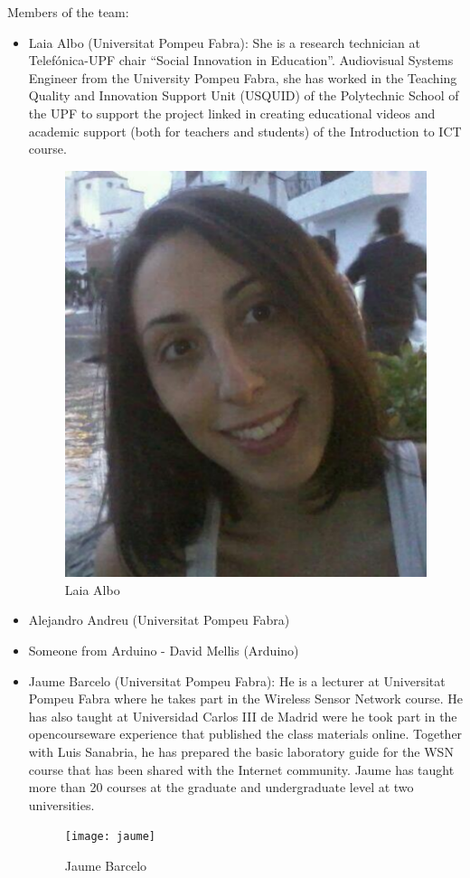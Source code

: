 \documentclass[oneside]{book}   %
\begin{document}
Members of the team:
\begin{itemize}
\item Laia Albo (Universitat Pompeu Fabra): She is a research technician at Telefónica-UPF chair ``Social Innovation in Education''. Audiovisual Systems Engineer from the University Pompeu Fabra, she has worked in the Teaching Quality and Innovation Support Unit (USQUID) of the Polytechnic School of the UPF to support the project linked in creating educational videos and academic support (both for teachers and students) of the Introduction to ICT course.
\begin{figure}
\begin{center}
\includegraphics[width=0.125\linewidth]{laia}
\caption{Laia Albo}
\label{fig:jaume}
\end{center}
\end{figure}
\item Alejandro Andreu (Universitat Pompeu Fabra)
\item Someone from Arduino - David Mellis (Arduino)
\item Jaume Barcelo (Universitat Pompeu Fabra): He is a lecturer at Universitat Pompeu Fabra where he takes part in the Wireless Sensor Network course. He has also taught at Universidad Carlos III de Madrid were he took part in the opencourseware experience that published the class materials online. Together with Luis Sanabria, he has prepared the basic laboratory guide for the WSN course that has been shared with the Internet community. Jaume has taught more than 20 courses at the graduate and undergraduate level at two universities.
\begin{figure}
\begin{center}
\texttt{[image: jaume]}
\caption{Jaume Barcelo}
\label{fig:jaume}
\end{center}
\end{figure}


\end{itemize}
\end{document}
